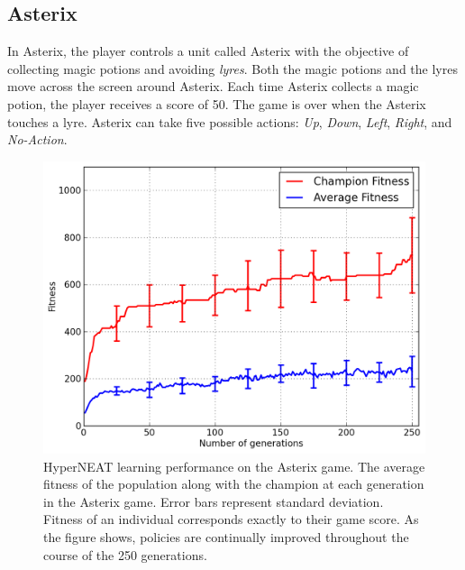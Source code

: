 \documentclass{acm_proc_article-sp}
\begin{document}
\subsection {Asterix}
In Asterix, the player controls a unit called Asterix with the objective of collecting magic potions and avoiding \textit{lyres}. Both the magic potions and the lyres move across the screen around Asterix. Each time Asterix collects a magic potion, the player receives a score of 50. The game is over when the Asterix touches a lyre. Asterix can take five possible actions: \textit{Up}, \textit{Down}, \textit{Left}, \textit{Right}, and \textit{No-Action}.

\begin{figure}[ht]
\begin{center}
\includegraphics[width=\columnwidth]{figures/asterix-results.png}
\end{center}
\caption{HyperNEAT learning performance on the Asterix game. The average fitness of the population along with the champion at each generation in the Asterix game. Error bars represent standard deviation. Fitness of an individual corresponds exactly to their game score. As the figure shows, policies are continually improved throughout the course of the 250 generations.}
\label{fig:asterix-curve}
\end{figure}
\end{document}
